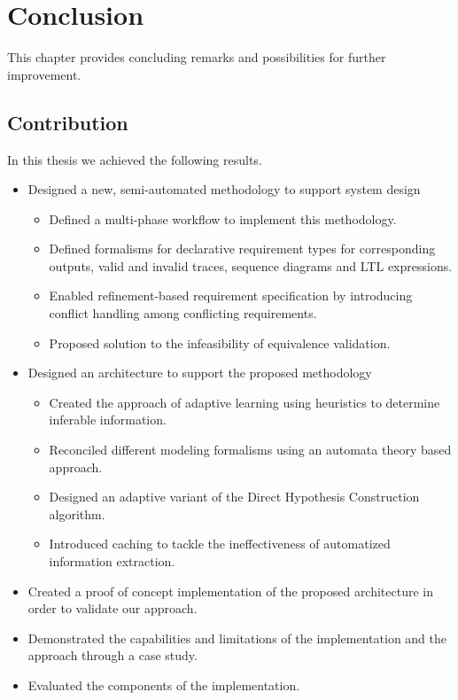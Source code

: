 \chapter{Conclusion} \label{conclusion}
This chapter provides concluding remarks and possibilities for further improvement.

\section{Contribution}

In this thesis we achieved the following results.

\begin{itemize}
	\item Designed a new, semi-automated methodology to support system design
	\begin{itemize}
		\item Defined a multi-phase workflow to implement this methodology.
		\item Defined formalisms for declarative requirement types for corresponding outputs, valid and invalid traces, sequence diagrams and LTL expressions.
		\item Enabled refinement-based requirement specification by introducing conflict handling among conflicting requirements.
		\item Proposed solution to the infeasibility of equivalence validation.
	\end{itemize}
	\item Designed an architecture to support the proposed methodology
	\begin{itemize}
		\item Created the approach of adaptive learning using heuristics to determine inferable information.
		\item Reconciled different modeling formalisms using an automata theory based approach.
		\item Designed an adaptive variant of the Direct Hypothesis Construction algorithm.
		\item Introduced caching to tackle the ineffectiveness of automatized information extraction.
	\end{itemize}
	\item Created a proof of concept implementation of the proposed architecture in order to validate our approach.
	\item Demonstrated the capabilities and limitations of the implementation and the approach through a case study.
	\item Evaluated the components of the implementation.
\end{itemize}
\clearpage
